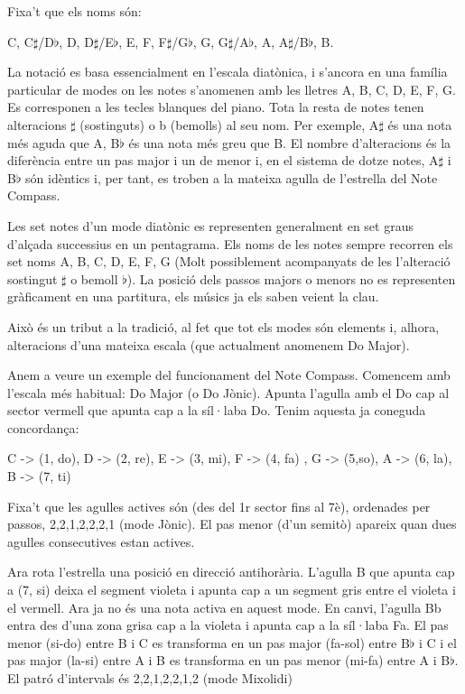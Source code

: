 Fixa't que els noms són:
\begin{center}
C, C$\sharp$/D$\flat$, D, D$\sharp$/E$\flat$, E, F, F$\sharp$/G$\flat$, G, G$\sharp$/A$\flat$, A, A$\sharp$/B$\flat$, B.
\end{center}
La notació es basa essencialment en l'escala diatònica, i s'ancora en una família particular de modes on les notes s'anomenen amb les lletres A, B, C, D, E, F, G. Es corresponen a les tecles blanques del piano. Tota la resta de notes tenen alteracions $\sharp$ (sostinguts) o b (bemolls) al seu nom. Per exemple, A$\sharp$ és una nota més aguda que A, B$\flat$ és una nota més greu que B. El nombre d'alteracions és la diferència entre un pas major i un de menor i, en el sistema de dotze notes, A$\sharp$ i B$\flat$ són idèntics i, per tant, es troben a la mateixa agulla de l'estrella del Note Compass.

Les set notes d'un mode diatònic es representen generalment en set graus d'alçada successius en un pentagrama. Els noms de les notes sempre recorren els set noms A, B, C, D, E, F, G (Molt possiblement acompanyats de les l'alteració sostingut $\sharp$ o bemoll $\flat$). La posició dels passos majors o menors no es representen gràficament en una partitura, els músics ja els saben veient la clau.

Això és un tribut a la tradició, al fet que tot els modes són elements i, alhora, alteracions d'una mateixa escala (que actualment anomenem Do Major).

Anem a veure un exemple del funcionament del Note Compass. Comencem amb l'escala més habitual: Do Major (o Do Jònic). Apunta l'agulla amb el Do cap al sector vermell que apunta cap a la síl·laba Do. Tenim aquesta ja coneguda concordança:

C -> (1, do), D -> (2, re), E -> (3, mi), F -> (4, fa) , G -> (5,so), A -> (6, la), B -> (7, ti)

Fixa't que les agulles actives són (des del 1r sector fins al 7è), ordenades per passos, 2,2,1,2,2,2,1 (mode Jònic). El pas menor (d'un semitò) apareix quan dues agulles consecutives estan actives.

Ara rota l'estrella una posició en direcció antihorària. L'agulla B que apunta cap a (7, si) deixa el segment violeta i apunta cap a un segment gris entre el violeta i el vermell. Ara ja no és una nota activa en aquest mode. En canvi, l'agulla Bb entra des d'una zona grisa cap a la violeta i apunta cap a la síl·laba Fa. El pas menor (si-do) entre B i C es transforma en un pas major (fa-sol) entre B$\flat$ i C i el pas major (la-si) entre A i B es transforma en un pas menor (mi-fa) entre A i B$\flat$. El patró d'intervals és 2,2,1,2,2,1,2 (mode Mixolidi) 

